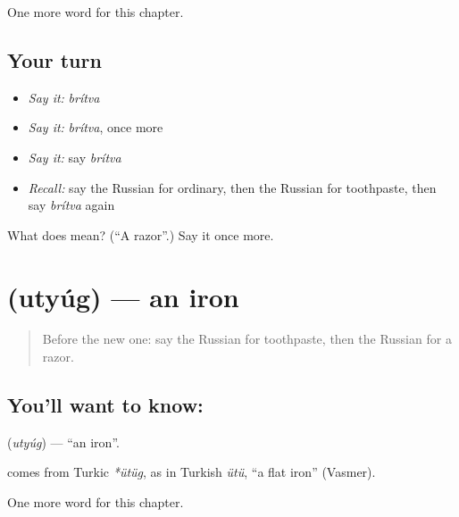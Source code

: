 \begin{grammarlens}[title={What you've built}]
One more word for this chapter.
\end{grammarlens}

\subsection*{Your turn}
\begin{itemize}
\raggedright
  \item \emph{Say it:} \emph{brítva}
  \item \emph{Say it:} \emph{brítva}, once more
  \item \emph{Say it:} say \emph{brítva}
  \item \emph{Recall:} say the Russian for ordinary, then the Russian for toothpaste, then say \emph{brítva} again
\end{itemize}

\begin{tcolorbox}[breakable,colback=teal!4,colframe=teal!35!black,title={Before you move on}]
What does  mean? (\textquotedblleft{}A razor\textquotedblright{}.) Say it once more.
\end{tcolorbox}
\section[\texorpdfstring{\ru{утюг} (utyúg)}{утюг (utyúg)}]{ (utyúg) — an iron}

\label{lesson:RU-C219-utyug}



\begin{quote}
Before the new one: say the Russian for toothpaste, then the Russian for a razor.
\end{quote}

\subsection*{You'll want to know: }
\textbf{} (\emph{utyúg}) — \textquotedblleft{}an iron\textquotedblright{}.

\begin{cousinweb}
\textbf{} comes from Turkic \emph{*ütüg}, as in Turkish \emph{ütü}, \textquotedblleft{}a flat iron\textquotedblright{} (Vasmer).
\end{cousinweb}

\begin{grammarlens}[title={What you've built}]
One more word for this chapter.
\end{grammarlens}

